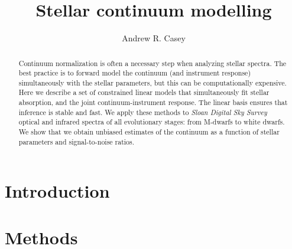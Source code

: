 \documentclass[modern]{aastex631}
\newcommand{\project}[1]{\textit{#1}}
\begin{document}
\title{\Huge Stellar continuum modelling}

\author[0000-0003-0174-0564]{Andrew R. Casey}



\begin{abstract}\noindent
Continuum normalization is often a necessary step when analyzing stellar spectra. The best practice is to forward model the continuum (and instrument response) simultaneously with the stellar parameters, but this can be computationally expensive.
Here we describe a set of constrained linear models that simultaneously fit stellar absorption, and the joint continuum-instrument response.
The linear basis ensures that inference is stable and fast.
We apply these methods to \project{Sloan Digital Sky Survey} optical and infrared spectra of all evolutionary stages: from M-dwarfs to white dwarfs.
We show that we obtain unbiased estimates of the continuum as a function of stellar parameters and signal-to-noise ratios.
\end{abstract}


\section*{}\clearpage
\section{Introduction}\label{sec:intro}


\section{Methods}\label{sec:methods}
\end{document}
